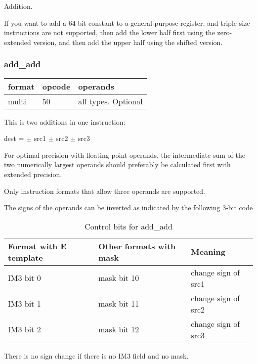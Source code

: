 \documentclass[forwardcom.tex]{subfiles}
\begin{document}
Addition.
\vspace{2mm}

If you want to add a 64-bit constant to a general purpose register, and triple size instructions are not supported, then add the lower half first using the zero-extended version, and then add the upper half using the shifted version.


\subsubsection{add\_add}
\label{table:addAddInstruction}
\begin{tabular}{|p{12mm}|p{12mm}|p{110mm}|}
\hline
\bfseries format & \bfseries opcode & \bfseries operands \\ \hline
multi & 50 & all types. Optional \\ \hline
\end{tabular}
\vspace{3mm}

This is two additions in one instruction:
\vspace{2mm}

dest = $\pm$ src1 $\pm$ src2 $\pm$ src3
\vspace{2mm}

For optimal precision with floating point operands, the intermediate sum of the two numerically largest operands should preferably be calculated first with extended precision.
\vspace{2mm}

Only instruction formats that allow three operands are supported.
\vspace{2mm}

The signs of the operands can be inverted as indicated by the following 3-bit code

\begin{longtable} {|p{20mm}|p{20mm}|p{75mm}|}
\caption{Control bits for add\_add} 
\label{table:ControlBitsForAddAdd} \\
\endfirsthead
\endhead
\hline
\bfseries Format with E template & \bfseries Other formats with mask & \bfseries Meaning   \\
\hline
IM3 bit 0 & mask bit 10 & change sign of src1 \\
IM3 bit 1 & mask bit 11 & change sign of src2 \\
IM3 bit 2 & mask bit 12 & change sign of src3 \\
\hline
\end{longtable}

There is no sign change if there is no IM3 field and no mask. 
\vspace{2mm}
\end{document}

